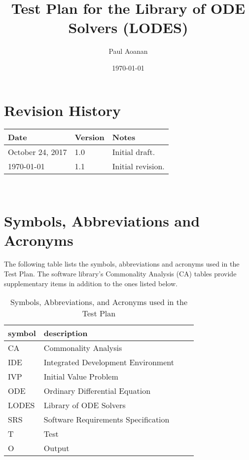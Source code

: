 \documentclass[12pt, titlepage]{article}
\newcommand{\famname}{LODES} %
\newcommand{\famdesc}{Library of ODE Solvers}
\begin{document}
\title{Test Plan for the Library of ODE Solvers (LODES)} 
\author{Paul Aoanan}
\date{\today}
	
\maketitle


\section{Revision History}
\begin{tabularx}{\textwidth}{p{3cm}p{2cm}X}
\toprule {\bf Date} & {\bf Version} & {\bf Notes}\\
\midrule
October 24, 2017 & 1.0 & Initial draft.\\
\today & 1.1 & Initial revision.\\
\bottomrule
\end{tabularx}

~\newpage

\section{Symbols, Abbreviations and Acronyms}
The following table lists the symbols, abbreviations and acronyms used in the Test Plan.
The software library's Commonality Analysis (CA) tables provide supplementary items in addition to the ones 
listed below.\\
\begin{table} [h]
\renewcommand{\arraystretch}{1.2}
\begin{tabular}{l l l l |} 
  \toprule		
  \textbf{symbol} & \textbf{description}\\
  \midrule 
  CA & Commonality Analysis\\
  IDE & Integrated Development Environment\\ 
  IVP & Initial Value Problem\\
  ODE & Ordinary Differential Equation\\
  \famname{} & \famdesc{}\\
  SRS & Software Requirements Specification\\
  T & Test\\
  O & Output\\
  \bottomrule
\end{tabular}\\
  \caption{Symbols, Abbreviations, and Acronyms used in the Test Plan}
  \label{Table:Table_Symbols}
\end{table}
\end{document}
